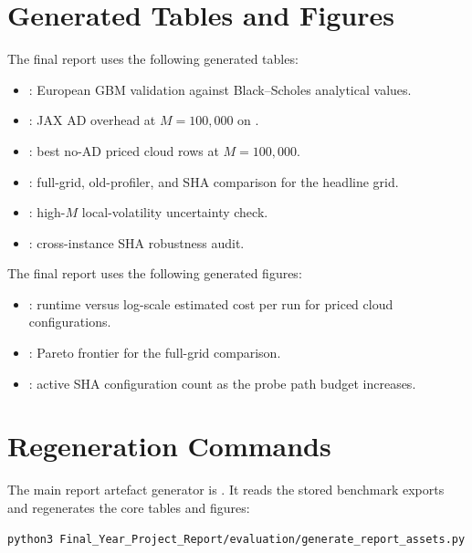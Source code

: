 \section{Generated Tables and Figures}

The final report uses the following generated tables:

\begin{itemize}
    \item {}: European GBM validation against
    Black--Scholes analytical values.
    \item {}: JAX AD overhead at \(M=100{,}000\) on
    .
    \item {}: best no-AD priced cloud rows at
    \(M=100{,}000\).
    \item {}: full-grid, old-profiler, and SHA
    comparison for the headline  grid.
    \item {}: high-\(M\) local-volatility
    uncertainty check.
    \item {}: cross-instance SHA robustness
    audit.
\end{itemize}

The final report uses the following generated figures:

\begin{itemize}
    \item {}: runtime versus
    log-scale estimated cost per run for priced cloud configurations.
    \item {}: Pareto frontier for the
     full-grid comparison.
    \item {}: active SHA configuration count as
    the probe path budget increases.
\end{itemize}

\section{Regeneration Commands}

The main report artefact generator is
. It
reads the stored benchmark exports and regenerates the core tables and figures:

\begin{verbatim}
python3 Final_Year_Project_Report/evaluation/generate_report_assets.py
\end{verbatim}

